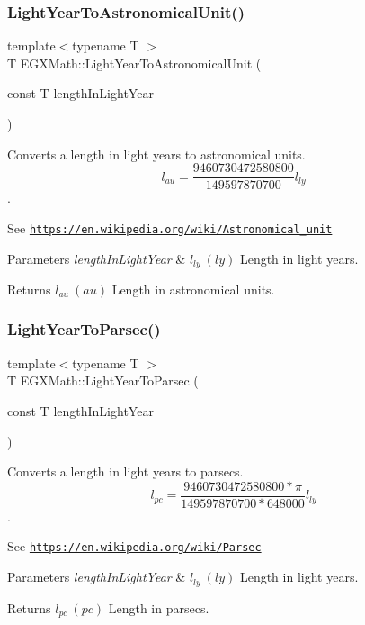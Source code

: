 \subsubsection{\texorpdfstring{Light\+Year\+To\+Astronomical\+Unit()}{LightYearToAstronomicalUnit()}}
{\footnotesize\ttfamily template$<$typename T $>$ \\
T E\+G\+X\+Math\+::\+Light\+Year\+To\+Astronomical\+Unit (\begin{DoxyParamCaption}\item[{const T}]{length\+In\+Light\+Year }\end{DoxyParamCaption})}



Converts a length in light years to astronomical units. \[ l_{au}= \frac{9460730472580800}{149597870700} l_{ly} \]. 

See \href{https://en.wikipedia.org/wiki/Astronomical_unit}{\tt https\+://en.\+wikipedia.\+org/wiki/\+Astronomical\+\_\+unit} 
\begin{DoxyParams}{Parameters}
{\em length\+In\+Light\+Year} & $ l_{ly}\ (ly)$ Length in light years. \\
\hline
\end{DoxyParams}
\begin{DoxyReturn}{Returns}
$ l_{au}\ (au)$ Length in astronomical units. 
\end{DoxyReturn}
\mbox{\label{group___e_g_x_math-_conversions-_length_conversions-_astronomical-_light_year-_astronomical_ga7fbe95808f04d03719e53d868b0cac45}} 
\subsubsection{\texorpdfstring{Light\+Year\+To\+Parsec()}{LightYearToParsec()}}
{\footnotesize\ttfamily template$<$typename T $>$ \\
T E\+G\+X\+Math\+::\+Light\+Year\+To\+Parsec (\begin{DoxyParamCaption}\item[{const T}]{length\+In\+Light\+Year }\end{DoxyParamCaption})}



Converts a length in light years to parsecs. \[ l_{pc}=\frac{9460730472580800 * \pi}{149597870700 * 648000} l_{ly} \]. 

See \href{https://en.wikipedia.org/wiki/Parsec}{\tt https\+://en.\+wikipedia.\+org/wiki/\+Parsec} 
\begin{DoxyParams}{Parameters}
{\em length\+In\+Light\+Year} & $ l_{ly}\ (ly)$ Length in light years. \\
\hline
\end{DoxyParams}
\begin{DoxyReturn}{Returns}
$ l_{pc}\ (pc)$ Length in parsecs. 
\end{DoxyReturn}
